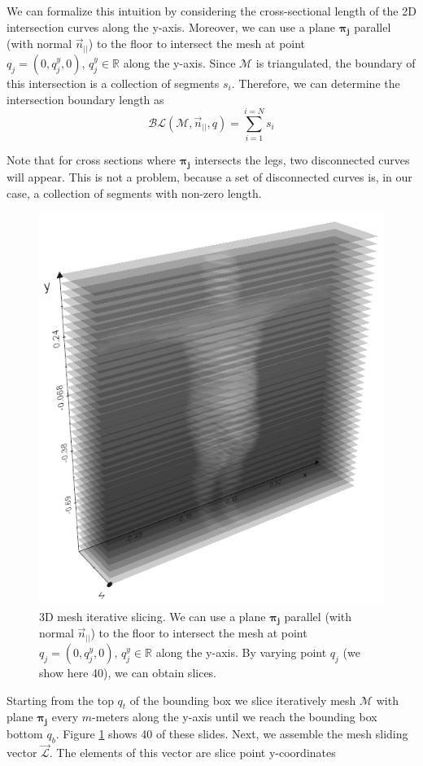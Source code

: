 \documentclass[runningheads, orivec]{llncs}
\begin{document}
We 
can formalize this intuition by considering the cross-sectional length of the 
2D intersection curves\cite{book.compu.topo} along the y-axis. Moreover, we 
can 
use a plane $\boldsymbol{\pi_j}$ parallel (with normal $\vec{n}_{||}$) to the 
floor to intersect the mesh at point $q_j = (0, q^y_j, 0), \,  q^y_j \in 
\mathbb{R}$ along the y-axis. Since $\mathcal{M}$ is triangulated, the boundary 
of this 
intersection is a collection of segments $s_i$. Therefore, we can 
determine the intersection boundary length as
\begin{equation}\label{eq:boundary_length}
\mathcal{BL}(\mathcal{M}, \vec{n}_{||}, q) = \sum_{i = 
	1}^{i = N}s_i
\end{equation}

Note that for cross sections where $\boldsymbol{\pi_j}$ intersects the legs, 
two 
disconnected curves will appear. This is not a problem, because a 
set of disconnected curves is, in our case, a collection of segments with 
non-zero length.

\begin{figure}[h!]
	\begin{center}
		\includegraphics[width=0.5\linewidth]{subject_2_with_cutting_planes_xrays.png}
	\end{center}
	\caption{3D mesh iterative slicing. We 
		can use a plane $\boldsymbol{\pi_j}$ parallel (with normal 
		$\vec{n}_{||}$) to the 
		floor to intersect the mesh at point $q_j = (0, q^y_j, 0), \,  q^y_j 
		\in 
		\mathbb{R}$ along the y-axis. By varying point $q_j$ (we show here 40), 
		we can obtain 
		slices.}
	\label{fig:subjects_planes_xrays}
\end{figure}

Starting 
from the 
top $q_t$ of the bounding box we slice iteratively mesh $\mathcal{M}$ with 
plane 
$\boldsymbol{\pi_j}$ every $m$-meters along the y-axis until we reach the 
bounding box bottom 
$q_b$. Figure \ref{fig:subjects_planes_xrays} shows 40 of these 
slides. Next, we assemble the mesh sliding vector $\vec{\mathcal{L}}$. The 
elements of 
this vector are slice point y-coordinates 
\end{document}
